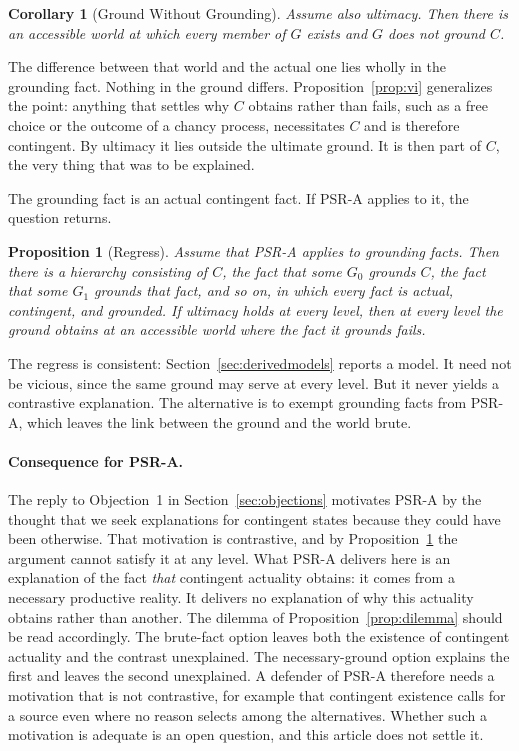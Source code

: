 \documentclass[11pt,letterpaper]{article}
\theoremstyle{plain}
\newtheorem{proposition}{Proposition}
\newtheorem{corollary}{Corollary}
\theoremstyle{definition}
\begin{document}
\begin{corollary}[Ground Without Grounding]\label{cor:idle}
Assume also ultimacy. Then there is an accessible world at which every member of $G$ exists and $G$ does not ground $C$.
\end{corollary}

The difference between that world and the actual one lies wholly in the grounding fact. Nothing in the ground differs. Proposition~\ref{prop:vi} generalizes the point: anything that settles why $C$ obtains rather than fails, such as a free choice or the outcome of a chancy process, necessitates $C$ and is therefore contingent. By ultimacy it lies outside the ultimate ground. It is then part of $C$, the very thing that was to be explained.

The grounding fact is an actual contingent fact. If PSR-A applies to it, the question returns.

\begin{proposition}[Regress]\label{prop:regress}
Assume that PSR-A applies to grounding facts. Then there is a hierarchy consisting of $C$, the fact that some $G_0$ grounds $C$, the fact that some $G_1$ grounds that fact, and so on, in which every fact is actual, contingent, and grounded. If ultimacy holds at every level, then at every level the ground obtains at an accessible world where the fact it grounds fails.
\end{proposition}

The regress is consistent: Section~\ref{sec:derivedmodels} reports a model. It need not be vicious, since the same ground may serve at every level. But it never yields a contrastive explanation. The alternative is to exempt grounding facts from PSR-A, which leaves the link between the ground and the world brute.

\paragraph{Consequence for PSR-A.} The reply to Objection~1 in Section~\ref{sec:objections} motivates PSR-A by the thought that we seek explanations for contingent states because they could have been otherwise. That motivation is contrastive, and by Proposition~\ref{prop:regress} the argument cannot satisfy it at any level. What PSR-A delivers here is an explanation of the fact \emph{that} contingent actuality obtains: it comes from a necessary productive reality. It delivers no explanation of why this actuality obtains rather than another. The dilemma of Proposition~\ref{prop:dilemma} should be read accordingly. The brute-fact option leaves both the existence of contingent actuality and the contrast unexplained. The necessary-ground option explains the first and leaves the second unexplained. A defender of PSR-A therefore needs a motivation that is not contrastive, for example that contingent existence calls for a source even where no reason selects among the alternatives. Whether such a motivation is adequate is an open question, and this article does not settle it.
\end{document}
